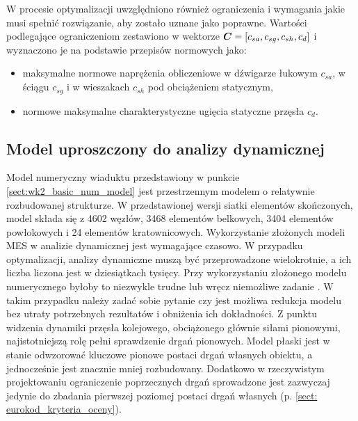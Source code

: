 W procesie optymalizacji uwzględniono również ograniczenia i wymagania jakie musi spełnić rozwiązanie, aby zostało uznane jako poprawne. Wartości podlegające ograniczeniom zestawiono w wektorze $\bm{C}=[c_{sa},c_{sg},c_{sh},c_{d}]$ i wyznaczono je na podstawie przepisów normowych \parencite{PKNc,PKNj} jako:
\begin{itemize}
	\item maksymalne normowe naprężenia obliczeniowe w dźwigarze łukowym $c_{sa}$, w ściągu $c_{sg}$ i w wieszakach $c_{sh}$ pod obciążeniem statycznym,
	\item normowe maksymalne charakterystyczne ugięcia statyczne przęsła $c_{d}$.
\end{itemize}
\subsection{Model uproszczony do analizy dynamicznej}

Model numeryczny wiaduktu przedstawiony w punkcie \ref{sect:wk2_basic_num_model} jest przestrzennym modelem o relatywnie rozbudowanej strukturze. W przedstawionej wersji siatki elementów skończonych, model składa się z 4602 węzłów, 3468 elementów belkowych, 3404 elementów powłokowych i 24 elementów kratownicowych. Wykorzystanie złożonych modeli MES w analizie dynamicznej jest wymagające czasowo. W przypadku optymalizacji, analizy dynamiczne muszą być przeprowadzone wielokrotnie, a ich liczba liczona jest w dziesiątkach tysięcy. Przy wykorzystaniu złożonego modelu numerycznego byłoby to niezwykle trudne lub wręcz niemożliwe zadanie \parencite{Zotowski2017c}. W takim przypadku należy zadać sobie pytanie czy jest możliwa redukcja modelu bez utraty potrzebnych rezultatów i obniżenia ich dokładności. Z punktu widzenia dynamiki przęsła kolejowego, obciążonego głównie siłami pionowymi, najistotniejszą rolę pełni sprawdzenie drgań pionowych. Model płaski jest w stanie odwzorować kluczowe pionowe postaci drgań własnych obiektu, a jednocześnie jest znacznie mniej rozbudowany. Dodatkowo w rzeczywistym projektowaniu ograniczenie poprzecznych drgań sprowadzone jest zazwyczaj jedynie do zbadania pierwszej poziomej postaci drgań własnych (p. \ref{sect: eurokod_kryteria_oceny}).  



